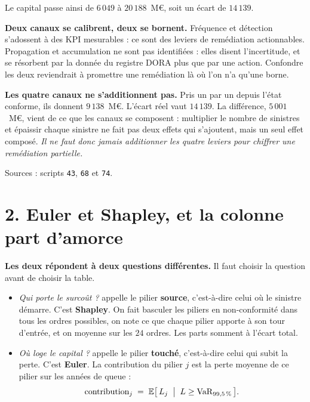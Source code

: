 \documentclass[11pt,a4paper]{article}
\begin{document}
Le capital passe ainsi de $6\,049$ à $20\,188$~M\euro, soit un écart de $14\,139$.

\textbf{Deux canaux se calibrent, deux se bornent.} Fréquence et détection s'adossent à des KPI
mesurables : ce sont des leviers de remédiation actionnables. Propagation et accumulation ne sont
pas identifiées : elles disent l'incertitude, et se résorbent par la donnée du registre DORA plus
que par une action. Confondre les deux reviendrait à promettre une remédiation là où l'on n'a
qu'une borne.

\textbf{Les quatre canaux ne s'additionnent pas.} Pris un par un depuis l'état conforme, ils
donnent $9\,138$~M\euro. L'écart réel vaut $14\,139$. La différence, $5\,001$~M\euro, vient de ce
que les canaux se composent : multiplier le nombre de sinistres et épaissir chaque sinistre ne
fait pas deux effets qui s'ajoutent, mais un seul effet composé. \emph{Il ne faut donc jamais
additionner les quatre leviers pour chiffrer une remédiation partielle.}

\medskip
{\small Sources : scripts \texttt{43}, \texttt{68} et \texttt{74}.}

\section*{2. Euler et Shapley, et la colonne \og part d'amorce \fg}

\textbf{Les deux répondent à deux questions différentes.} Il faut choisir la question avant de
choisir la table.

\begin{itemize}\itemsep1pt
\item \emph{Qui porte le surcoût ?} appelle le pilier \textbf{source}, c'est-à-dire celui où le
sinistre démarre. C'est \textbf{Shapley}. On fait basculer les piliers en non-conformité dans
tous les ordres possibles, on note ce que chaque pilier apporte à son tour d'entrée, et on
moyenne sur les $24$ ordres. Les parts somment à l'écart total.
\item \emph{Où loge le capital ?} appelle le pilier \textbf{touché}, c'est-à-dire celui qui subit
la perte. C'est \textbf{Euler}. La contribution du pilier $j$ est la perte moyenne de ce pilier
sur les années de queue :
\[
  \text{contribution}_j \;=\; \mathbb{E}\bigl[\,L_j \;\bigm|\; L \geq \mathrm{VaR}_{99{,}5\,\%}\,\bigr].
\]
\end{itemize}
\end{document}
